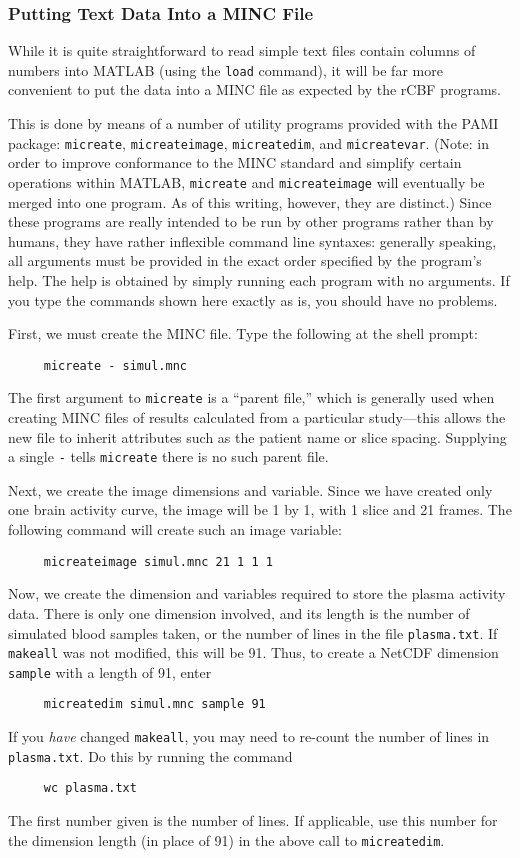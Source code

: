 \subsubsection{Putting Text Data Into a MINC File}

While it is quite straightforward to read simple text files contain
columns of numbers into MATLAB (using the \verb|load| command), it
will be far more convenient to put the data into a MINC file as
expected by the rCBF programs.

This is done by means of a number of utility programs provided with
the PAMI package: \verb|micreate|, \verb|micreateimage|,
\verb|micreatedim|, and \verb|micreatevar|.  (Note: in order to
improve conformance to the MINC standard and simplify certain
operations within MATLAB, \verb|micreate| and \verb|micreateimage|
will eventually be merged into one program.  As of this writing,
however, they are distinct.)  Since these programs are really intended
to be run by other programs rather than by humans, they have rather
inflexible command line syntaxes: generally speaking, all arguments
must be provided in the exact order specified by the program's help.
The help is obtained by simply running each program with no arguments.
If you type the commands shown here exactly as is, you should have no
problems.

First, we must create the MINC file.  Type the following at the shell
prompt:
\begin{verbatim}
     micreate - simul.mnc
\end{verbatim}
The first argument to \verb|micreate| is a ``parent file,'' which is
generally used when creating MINC files of results calculated from a
particular study---this allows the new file to inherit attributes such
as the patient name or slice spacing.  Supplying a single \verb|-|
tells \verb|micreate| there is no such parent file.

Next, we create the image dimensions and variable.  Since we have
created only one brain activity curve, the image will be 1 by 1, with
1 slice and 21 frames.  The following command will create such an
image variable:
\begin{verbatim}
     micreateimage simul.mnc 21 1 1 1
\end{verbatim}

Now, we create the dimension and variables required to store the
plasma activity data.  There is only one dimension involved, and its
length is the number of simulated blood samples taken, or the number
of lines in the file \verb|plasma.txt|.  If \verb|makeall| was not
modified, this will be 91.  Thus, to create a NetCDF dimension
\verb|sample| with a length of 91, enter
\begin{verbatim}
     micreatedim simul.mnc sample 91
\end{verbatim}
If you {\em have} changed \verb|makeall|, you may need to re-count the
number of lines in \verb|plasma.txt|.  Do this by running the command
\begin{verbatim}
     wc plasma.txt
\end{verbatim}
The first number given is the number of lines.  If applicable, use
this number for the dimension length (in place of 91) in the above
call to \verb|micreatedim|.

